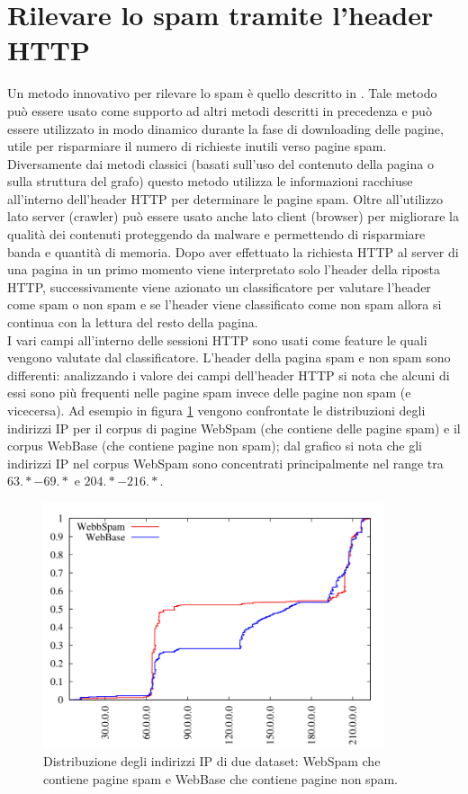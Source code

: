 \section{Rilevare lo spam tramite l'header HTTP}
Un metodo innovativo per rilevare lo spam è quello descritto in \cite{Webb:2008:PWS:1458082.1458129}. Tale metodo può essere usato come supporto ad altri metodi descritti in precedenza e può essere utilizzato in modo dinamico durante la fase di downloading delle pagine, utile per risparmiare il numero di richieste inutili verso pagine spam. Diversamente dai metodi classici (basati sull'uso del contenuto della pagina o sulla struttura del grafo) questo metodo utilizza le informazioni racchiuse all'interno dell'header HTTP per determinare le pagine spam. Oltre all'utilizzo lato server (crawler) può essere usato anche lato client (browser) per migliorare la qualità dei contenuti proteggendo da malware e permettendo di risparmiare banda e quantità di memoria. Dopo aver  effettuato la richiesta HTTP al server di una pagina in un primo momento viene interpretato solo l'header della riposta HTTP, successivamente viene azionato un classificatore per valutare l'header come spam o non spam e se l'header viene classificato 
come non spam allora si continua con la lettura del resto della pagina.\\ 
I vari campi all'interno delle sessioni HTTP sono usati come feature le quali vengono  valutate dal classificatore. L'header della pagina spam e non spam sono differenti: analizzando i valore dei campi dell'header HTTP si nota che alcuni di essi sono più frequenti nelle pagine spam invece delle pagine non spam (e vicecersa). Ad esempio in figura \ref{img:webb1} vengono confrontate le distribuzioni degli indirizzi IP per il corpus di pagine WebSpam (che contiene delle pagine spam) e il corpus WebBase (che contiene pagine non spam); dal grafico si nota che gli indirizzi IP nel corpus WebSpam sono concentrati principalmente nel range tra \(63.* - 69.*\) e \(204.* - 216.*\).
\begin{figure}
\centering
\includegraphics[width=10cm]{immagini/altre/webb.png}
\caption{Distribuzione degli indirizzi IP di due dataset: WebSpam che contiene pagine spam e WebBase che contiene pagine non spam.}
\label{img:webb1}
\end{figure}
